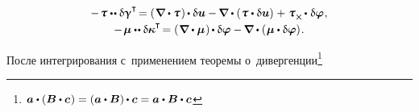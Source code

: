 \begin{otherlanguage}{russian}
\nopagebreak\vspace{-0.4em}\begin{equation*}
\begin{array}{c}
- \hspace{.2ex} \forcestresstensor \dotdotp \variation{\distortiontensor}^{\T} \hspace{-0.32ex}
= \left( \hspace{.12ex} \boldnabla \dotp \forcestresstensor \hspace{.12ex} \right) \hspace{-0.16ex} \dotp \variation{\fieldofdisplacements}
- \hspace{-0.15ex} \boldnabla \dotp \left( \hspace{.1ex} \forcestresstensor \dotp \variation{\fieldofdisplacements} \right) \hspace{.1ex}
+ \hspace{.1ex} \forcestresstensor_{\Xcompanion} \hspace{-0.1ex} \dotp \hspace{.1ex} \variation{\fieldofrotations} \hspace{.1ex} ,
\\[.25em]
%
- \hspace{.2ex} \couplestresstensor \dotdotp \variation{\wrynesstensor}^{\T} \hspace{-0.32ex}
= \left( \hspace{.12ex} \boldnabla \dotp \couplestresstensor \hspace{.12ex} \right) \hspace{-0.16ex} \dotp \variation{\fieldofrotations}
- \hspace{-0.15ex} \boldnabla \dotp \left( \hspace{.1ex} \couplestresstensor \dotp \variation{\fieldofrotations} \right) \hspace{-0.25ex} .
\end{array}
\end{equation*}

\vspace{-0.25em} \noindent После интегрирования с~применением теоремы о~дивергенции\footnote{${\bm{a} \dotp (\bm{B} \dotp \bm{c} \hspace{.1ex}) = (\bm{a} \dotp \bm{B}) \hspace{-0.1ex} \dotp \bm{c} = \bm{a} \dotp \bm{B} \dotp \bm{c}}$}


\end{otherlanguage}

